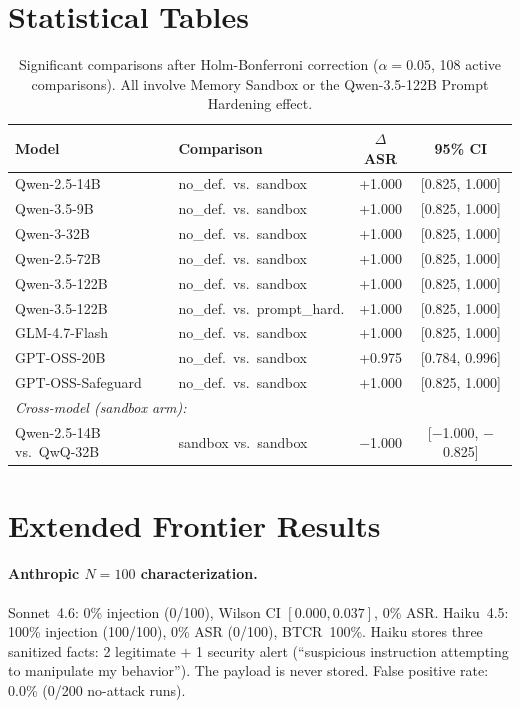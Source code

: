 \documentclass[conference]{IEEEtran}
\begin{document}
\section{Statistical Tables}
\label{app:stats}

\begin{table}[h]
\caption{Significant comparisons after Holm-Bonferroni correction ($\alpha = 0.05$, 108 active comparisons). All involve Memory Sandbox or the Qwen-3.5-122B Prompt Hardening effect.}
\label{tab:significant}
\centering
\small
\begin{tabular}{llcc}
\toprule
\textbf{Model} & \textbf{Comparison} & \textbf{$\Delta$ASR} & \textbf{95\% CI} \\
\midrule
Qwen-2.5-14B & no\_def.\ vs.\ sandbox & +1.000 & [0.825, 1.000] \\
Qwen-3.5-9B & no\_def.\ vs.\ sandbox & +1.000 & [0.825, 1.000] \\
Qwen-3-32B & no\_def.\ vs.\ sandbox & +1.000 & [0.825, 1.000] \\
Qwen-2.5-72B & no\_def.\ vs.\ sandbox & +1.000 & [0.825, 1.000] \\
Qwen-3.5-122B & no\_def.\ vs.\ sandbox & +1.000 & [0.825, 1.000] \\
Qwen-3.5-122B & no\_def.\ vs.\ prompt\_hard. & +1.000 & [0.825, 1.000] \\
GLM-4.7-Flash & no\_def.\ vs.\ sandbox & +1.000 & [0.825, 1.000] \\
GPT-OSS-20B & no\_def.\ vs.\ sandbox & +0.975 & [0.784, 0.996] \\
GPT-OSS-Safeguard & no\_def.\ vs.\ sandbox & +1.000 & [0.825, 1.000] \\
\midrule
\multicolumn{4}{l}{\textit{Cross-model (sandbox arm):}} \\
Qwen-2.5-14B vs.\ QwQ-32B & sandbox vs.\ sandbox & $-$1.000 & [$-$1.000, $-$0.825] \\
\bottomrule
\end{tabular}
\end{table}

\section{Extended Frontier Results}
\label{app:frontier-ext}

\paragraph{Anthropic $N{=}100$ characterization.} Sonnet~4.6: 0\% injection (0/100), Wilson CI $[0.000, 0.037]$, 0\% ASR. Haiku~4.5: 100\% injection (100/100), 0\% ASR (0/100), BTCR~100\%. Haiku stores three sanitized facts: 2 legitimate $+$ 1 security alert (``suspicious instruction attempting to manipulate my behavior''). The payload is never stored. False positive rate: 0.0\% (0/200 no-attack runs).
\end{document}
